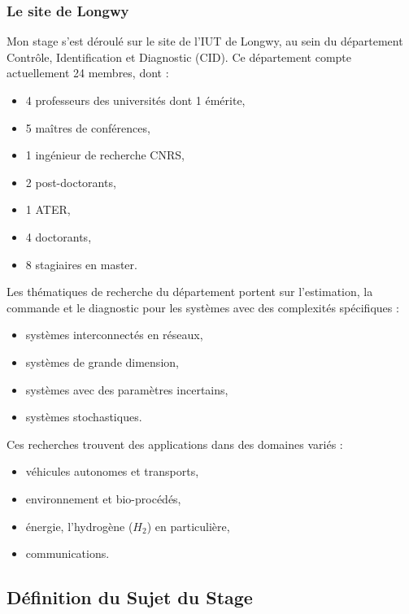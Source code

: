 \documentclass{name}
\begin{document}
\subsubsection{Le site de Longwy}

Mon stage s'est déroulé sur le site de l'IUT de Longwy, au sein du département Contrôle, Identification et Diagnostic (CID). Ce département compte actuellement 24 membres, dont :

\begin{itemize}
  \item 4 professeurs des universités dont 1 émérite,
  \item 5 maîtres de conférences,
  \item 1 ingénieur de recherche CNRS,
  \item 2 post-doctorants,
  \item 1 ATER,
  \item 4 doctorants,
  \item 8 stagiaires en master.
\end{itemize}

Les thématiques de recherche du département portent sur l'estimation, la commande et le diagnostic pour les systèmes avec des complexités spécifiques :

\begin{itemize}
  \item systèmes interconnectés en réseaux, 
  \item systèmes de grande dimension, 
  \item systèmes avec des paramètres incertains, 
  \item systèmes stochastiques.
\end{itemize}

Ces recherches trouvent des applications dans des domaines variés : 

\begin{itemize}
  \item véhicules autonomes et transports, 
  \item environnement et bio-procédés, 
  \item énergie, l'hydrogène ($H_2$) en particulière, 
  \item communications.
\end{itemize}

\newpage

\subsection{Définition du Sujet du Stage}
\end{document}
